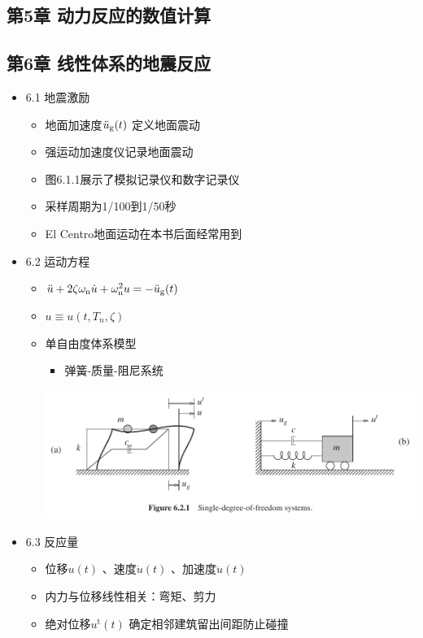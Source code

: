 \documentclass[11pt]{article}
\begin{document}
\subsection*{第5章 动力反应的数值计算}
\label{sec:org6dce0e6}
\subsection*{第6章 线性体系的地震反应}
\label{sec:org07d3987}
\begin{itemize}
\item 6.1 地震激励
\label{sec:org46e1be8}
\begin{itemize}
\item 地面加速度\(\ddot{u}_\mathrm{g}(t)\) 定义地面震动
\item 强运动加速度仪记录地面震动
\item 图6.1.1展示了模拟记录仪和数字记录仪
\item 采样周期为1/100到1/50秒
\item El Centro地面运动在本书后面经常用到
\end{itemize}
\item 6.2 运动方程
\label{sec:org7ef3b44}
\begin{itemize}
\item \(\ddot{u} + 2\zeta\omega_\mathrm{n}\dot{u} + \omega^{2}_\mathrm{n} u=-\ddot{u}_\mathrm{g}(t)\)
\item \(u\equiv u(t,T_{n},\zeta)\)
\item 单自由度体系模型 
\begin{itemize}
\item 弹簧-质量-阻尼系统
\end{itemize}
\begin{center}
\includegraphics[width=.9\linewidth]{./figures/F6.2.1.png}
\end{center}
\end{itemize}
\item 6.3 反应量
\label{sec:org967a98d}
\begin{itemize}
\item 位移\(u(t)\) 、速度\(\dot{u}(t)\) 、加速度\(\ddot{u}(t)\)
\item 内力与位移线性相关：弯矩、剪力
\item 绝对位移\(u^{\mathrm{t}}(t)\) 确定相邻建筑留出间距防止碰撞

\end{itemize}
\end{itemize}
\end{document}
